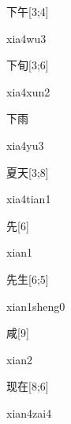 \begin{verbete}[xia4wu3]{下午}[3;4]
\begin{pronuncia}{xia4wu3}
\end{pronuncia}
\end{verbete}

\begin{verbete}{下旬}[3;6]
\begin{pronuncia}{xia4xun2}
\end{pronuncia}
\end{verbete}

\begin{verbete}[xia4yu3]{下雨}
\begin{pronuncia}{xia4yu3}
\end{pronuncia}
\end{verbete}

\begin{verbete}{夏天}[3;8]
\begin{pronuncia}{xia4tian1}
\end{pronuncia}
\end{verbete}

\begin{verbete}[xian1]{先}[6]
\begin{pronuncia}{xian1}
\end{pronuncia}
\end{verbete}

\begin{verbete}{先生}[6;5]
\begin{pronuncia}{xian1sheng0}
\end{pronuncia}
\end{verbete}

\begin{verbete}[xian2]{咸}[9]
\begin{pronuncia}{xian2}
\end{pronuncia}
\end{verbete}

\begin{verbete}{现在}[8;6]
\begin{pronuncia}{xian4zai4}
\end{pronuncia}
\end{verbete}

